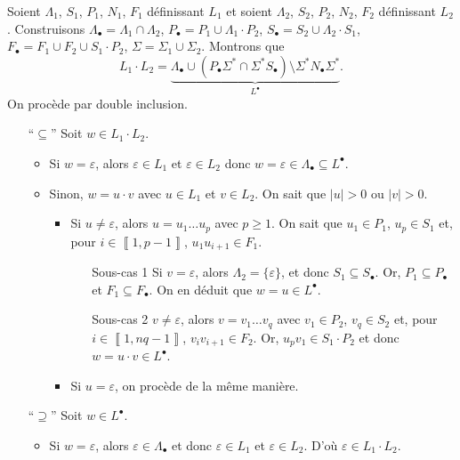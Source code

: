 \begin{prv}
	Soient $\Lambda_1$, $S_1$, $P_1$, $N_1$, $F_1$\/ définissant $L_1$\/ et soient $\Lambda_2$, $S_2$, $P_2$, $N_2$, $F_2$\/ définissant $L_2$.
	Construisons $\Lambda_\bullet = \Lambda_1 \cap \Lambda_2$, $P_\bullet = P_1 \cup \Lambda_1 \cdot P_2$, $S_\bullet = S_2 \cup \Lambda_2 \cdot S_1$, $F_\bullet = F_1 \cup F_2 \cup S_1\cdot P_2$, $\Sigma = \Sigma_1 \cup \Sigma_2$.
	Montrons que \[
		L_1 \cdot L_2 = \underbrace{\Lambda_\bullet \cup (P_\bullet \Sigma^* \cap \Sigma^* S_\bullet) \setminus \Sigma^* N_\bullet \Sigma^*}_{L^\bullet}
	.\]
	On procède par double inclusion.
	\begin{itemize}
		\item[``$\subseteq$''] Soit $w \in L_1\cdot L_2$.
			\begin{itemize}
				\item Si $w = \varepsilon$, alors $\varepsilon \in L_1$\/ et $\varepsilon \in L_2$\/ donc $w = \varepsilon \in \Lambda_\bullet \subseteq  L^\bullet$.
				\item Sinon, $w = u \cdot v$\/ avec $u \in L_1$\/ et $v \in L_2$.
					On sait que $|u| > 0$\/ ou $|v| > 0$.
					\begin{itemize}
						\item Si $ u\neq \varepsilon$, alors $u = u_1 \ldots u_p$\/ avec $p \ge 1$. On sait que $u_1 \in P_1$, $u_p \in S_1$\/ et, pour $i \in \left\llbracket 1,p-1 \right\rrbracket$, $u_1 u_{i+1} \in F_1$.
							\begin{itemize}
								\item[{\sc Sous-cas 1}] Si $v = \varepsilon$, alors $\Lambda_2 = \{\varepsilon\}$, et donc $S_1 \subseteq S_\bullet$. Or, $P_1 \subseteq P_\bullet$\/ et $F_1 \subseteq F_\bullet$.
									On en déduit que $w = u \in L^\bullet$.
								\item[{\sc Sous-cas 2}] $v \neq \varepsilon$, alors $v = v_1 \ldots v_q$\/ avec $v_1 \in P_2$, $v_q \in S_2$\/ et, pour $i \in \left\llbracket 1,nq-1 \right\rrbracket$, $v_iv_{i+1} \in F_2$. Or, $u_p v_1 \in S_1 \cdot P_2$\/ et donc $w = u\cdot v \in L^\bullet$.
							\end{itemize}
						\item Si $u = \varepsilon$, on procède de la même manière.
					\end{itemize}
			\end{itemize}
		\item[``$\supseteq$'']
			Soit $w \in L^\bullet$.
			\begin{itemize}
				\item Si $w = \varepsilon$, alors $\varepsilon \in \Lambda_\bullet$\/ et donc $\varepsilon \in L_1$\/ et $\varepsilon \in L_2$. D'où $\varepsilon \in L_1 \cdot L_2$.

\end{itemize}
\end{itemize}
\end{prv}
